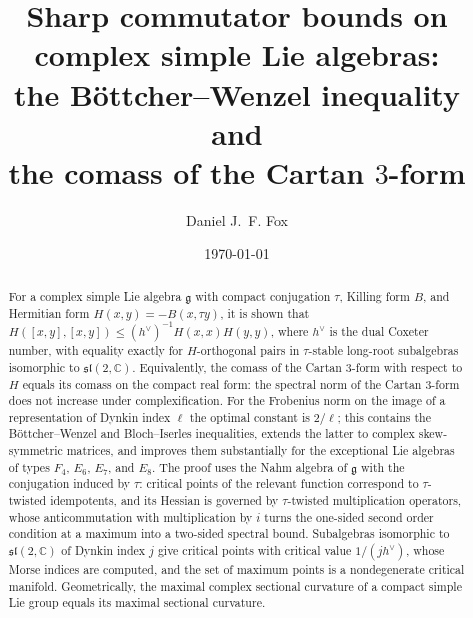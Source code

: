 \documentclass [leqno, 10pt]{amsart}
\theoremstyle{definition}
\numberwithin{equation}{section}
\newcommand{\sll}{\mathfrak{sl}}
\newcommand{\g}{\mathfrak{g}}
\newcommand{\com}{\mathbb C}
\begin{document}
\title[Sharp commutator bounds on simple Lie algebras]{Sharp commutator bounds on complex simple Lie algebras:\texorpdfstring{\\}{ } the Böttcher--Wenzel inequality and\texorpdfstring{\\}{ } the comass of the Cartan $3$-form}

\author{Daniel J.~F. Fox}
\address{Departamento de Matemática Aplicada\\ Escuela Técnica Superior de Arquitectura\\ Universidad Politécnica de Madrid\\Av. Juan de Herrera 4 \\ 28040 Madrid España}

\date{\today}


\begin{abstract}
For a complex simple Lie algebra $\g$ with compact conjugation $\tau$, Killing form $B$, and Hermitian form $H(x, y) = -B(x, \tau y)$, it is shown that $H([x,y],[x,y]) \leq (h^{\vee})^{-1}H(x,x)H(y,y)$, where $h^{\vee}$ is the dual Coxeter number, with equality exactly for $H$-orthogonal pairs in $\tau$-stable long-root subalgebras isomorphic to $\sll(2, \com)$. Equivalently, the comass of the Cartan $3$-form with respect to $H$ equals its comass on the compact real form: the spectral norm of the Cartan $3$-form does not increase under complexification. For the Frobenius norm on the image of a representation of Dynkin index $\ell$ the optimal constant is $2/\ell$; this contains the Böttcher--Wenzel and Bloch--Iserles inequalities, extends the latter to complex skew-symmetric matrices, and improves them substantially for the exceptional Lie algebras of types $F_{4}$, $E_{6}$, $E_{7}$, and $E_{8}$. The proof uses the Nahm algebra of $\g$ with the conjugation induced by $\tau$: critical points of the relevant function correspond to $\tau$-twisted idempotents, and its Hessian is governed by $\tau$-twisted multiplication operators, whose anticommutation with multiplication by $i$ turns the one-sided second order condition at a maximum into a two-sided spectral bound. Subalgebras isomorphic to $\sll(2, \com)$ of Dynkin index $j$ give critical points with critical value $1/(jh^{\vee})$, whose Morse indices are computed, and the set of maximum points is a nondegenerate critical manifold. Geometrically, the maximal complex sectional curvature of a compact simple Lie group equals its maximal sectional curvature.
\end{abstract}
\end{document}
